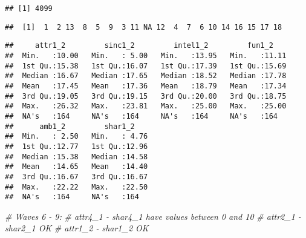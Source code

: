 \documentclass[]{article}
\newenvironment{Shaded}{\begin{snugshade}}{\end{snugshade}}
\newcommand{\KeywordTok}[1]{\textcolor[rgb]{0.13,0.29,0.53}{\textbf{#1}}}
\newcommand{\DecValTok}[1]{\textcolor[rgb]{0.00,0.00,0.81}{#1}}
\newcommand{\StringTok}[1]{\textcolor[rgb]{0.31,0.60,0.02}{#1}}
\newcommand{\CommentTok}[1]{\textcolor[rgb]{0.56,0.35,0.01}{\textit{#1}}}
\newcommand{\OperatorTok}[1]{\textcolor[rgb]{0.81,0.36,0.00}{\textbf{#1}}}
\newcommand{\NormalTok}[1]{#1}
\begin{document}
\begin{verbatim}
## [1] 4099
\end{verbatim}

\begin{Shaded}
\end{Shaded}

\begin{verbatim}
##  [1]  1  2 13  8  5  9  3 11 NA 12  4  7  6 10 14 16 15 17 18
\end{verbatim}

\begin{Shaded}
\end{Shaded}

\begin{verbatim}
##     attr1_2         sinc1_2         intel1_2         fun1_2     
##  Min.   :10.00   Min.   : 5.00   Min.   :13.95   Min.   :11.11  
##  1st Qu.:15.38   1st Qu.:16.07   1st Qu.:17.39   1st Qu.:15.69  
##  Median :16.67   Median :17.65   Median :18.52   Median :17.78  
##  Mean   :17.45   Mean   :17.36   Mean   :18.79   Mean   :17.34  
##  3rd Qu.:19.05   3rd Qu.:19.15   3rd Qu.:20.00   3rd Qu.:18.75  
##  Max.   :26.32   Max.   :23.81   Max.   :25.00   Max.   :25.00  
##  NA's   :164     NA's   :164     NA's   :164     NA's   :164    
##      amb1_2         shar1_2     
##  Min.   : 2.50   Min.   : 4.76  
##  1st Qu.:12.77   1st Qu.:12.96  
##  Median :15.38   Median :14.58  
##  Mean   :14.65   Mean   :14.40  
##  3rd Qu.:16.67   3rd Qu.:16.67  
##  Max.   :22.22   Max.   :22.50  
##  NA's   :164     NA's   :164
\end{verbatim}

\begin{Shaded}
\begin{Highlighting}[]
\CommentTok{# Waves 6 - 9:}
\CommentTok{# attr4_1 - shar4_1 have values between 0 and 10}
\CommentTok{# attr2_1 - shar2_1 OK}
\CommentTok{# attr1_2 - shar1_2 OK}
\end{Highlighting}
\end{Shaded}
\end{document}
